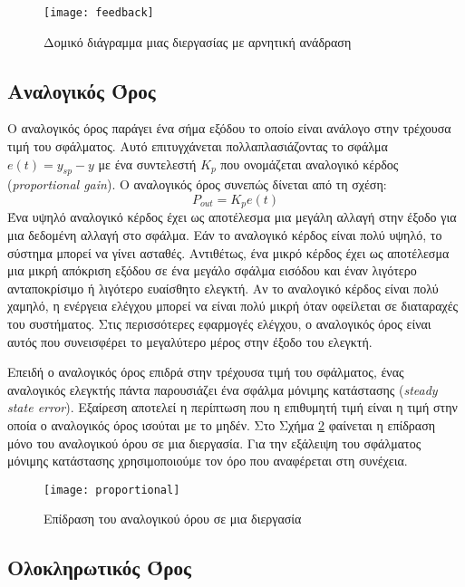 \begin{figure}[h]
  \centering
  \texttt{[image: feedback]}
  \caption{Δομικό διάγραμμα μιας διεργασίας με αρνητική ανάδραση}
  \label{fig:feedback}
\end{figure}

\subsection{Αναλογικός Όρος} \label{subsec:proportional_control}

Ο αναλογικός όρος παράγει ένα σήμα εξόδου το οποίο είναι ανάλογο στην τρέχουσα τιμή του σφάλματος. Αυτό επιτυγχάνεται πολλαπλασιάζοντας το σφάλμα $e(t)=y_{sp} - y$ με ένα συντελεστή $K_p$ που ονομάζεται αναλογικό κέρδος (\emph{proportional gain}). Ο αναλογικός όρος συνεπώς δίνεται από τη σχέση:
\begin{equation}
P_{out}=K_p e(t)
\label{eq:p_out}
\end{equation}
Ένα υψηλό αναλογικό κέρδος έχει ως αποτέλεσμα μια μεγάλη αλλαγή στην έξοδο για μια δεδομένη αλλαγή στο σφάλμα. Εάν το αναλογικό κέρδος είναι πολύ υψηλό, το σύστημα μπορεί να γίνει ασταθές. Αντιθέτως, ένα μικρό κέρδος έχει ως αποτέλεσμα μια μικρή απόκριση εξόδου σε ένα μεγάλο σφάλμα εισόδου και έναν λιγότερο ανταποκρίσιμο ή λιγότερο ευαίσθητο ελεγκτή. Αν το αναλογικό κέρδος είναι πολύ χαμηλό, η ενέργεια ελέγχου μπορεί να είναι πολύ μικρή όταν οφείλεται σε διαταραχές του συστήματος. Στις περισσότερες εφαρμογές ελέγχου, ο αναλογικός όρος είναι αυτός που συνεισφέρει το μεγαλύτερο μέρος στην έξοδο του ελεγκτή.

Επειδή ο αναλογικός όρος επιδρά στην τρέχουσα τιμή του σφάλματος, ένας αναλογικός ελεγκτής πάντα παρουσιάζει ένα σφάλμα μόνιμης κατάστασης (\emph{steady state error}). Εξαίρεση αποτελεί η περίπτωση που η επιθυμητή τιμή είναι η τιμή στην οποία ο αναλογικός όρος ισούται με το μηδέν. Στο Σχήμα \ref{fig:proportional} φαίνεται η επίδραση μόνο του αναλογικού όρου σε μια διεργασία. Για την εξάλειψη του σφάλματος μόνιμης κατάστασης χρησιμοποιούμε τον όρο που αναφέρεται στη συνέχεια.

\begin{figure}[h]
  \centering
  \texttt{[image: proportional]}
  \caption{Επίδραση του αναλογικού όρου σε μια διεργασία}
  \label{fig:proportional}
\end{figure}

\subsection{Ολοκληρωτικός Όρος}

